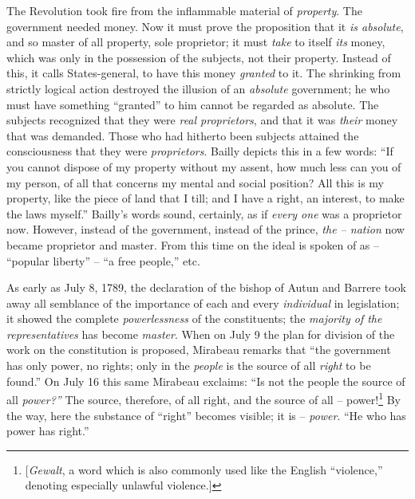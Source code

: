 \documentclass[12pt,a4paper]{book}
\begin{document}
The Revolution took fire from the inflammable material of \textit{property}. 
The government needed money. Now it must prove the proposition that it 
\textit{is absolute}, and so master of all property, sole proprietor; it must 
\textit{take} to itself \textit{its} money, which was only in the possession 
of the subjects, not their property. Instead of this, it calls States-general, 
to have this money \textit{granted} to it. The shrinking from strictly logical 
action destroyed the illusion of an \textit{absolute} government; he who must 
have something ``granted'' to him cannot be regarded as absolute. The 
subjects recognized that they were \textit{real proprietors}, and that it was 
\textit{their} money that was demanded. Those who had hitherto been subjects 
attained the consciousness that they were \textit{proprietors}. Bailly depicts 
this in a few words: ``If you cannot dispose of my property without my 
assent, how much less can you of my person, of all that concerns my mental and 
social position? All this is my property, like the piece of land that I till; 
and I have a right, an interest, to make the laws myself.'' Bailly's words 
sound, certainly, as if \textit{every one} was a proprietor now. However, 
instead of the government, instead of the prince, \textit{the -- nation} now 
became proprietor and master. From this time on the ideal is spoken of as -- 
``popular liberty'' -- ``a free people,'' etc.

As early as July 8, 1789, the declaration of the bishop of Autun and Barrere 
took away all semblance of the importance of each and every 
\textit{individual} in legislation; it showed the complete 
\textit{powerlessness} of the constituents; the \textit{majority of the 
representatives} has become \textit{master}. When on July 9 the plan for 
division of the work on the constitution is proposed, Mirabeau remarks that 
``the government has only power, no rights; only in the \textit{people} is 
the source of all \textit{right} to be found.'' On July 16 this same Mirabeau 
exclaims: ``Is not the people the source of all \textit{power?''} The 
source, therefore, of all right, and the source of all -- 
power!\footnote{[\textit{Gewalt}, a word which is also commonly used like the 
English ``violence,'' denoting especially unlawful violence.]} By the way, 
here the substance of ``right'' becomes visible; it is -- \textit{power}. 
``He who has power has right.''
\end{document}
